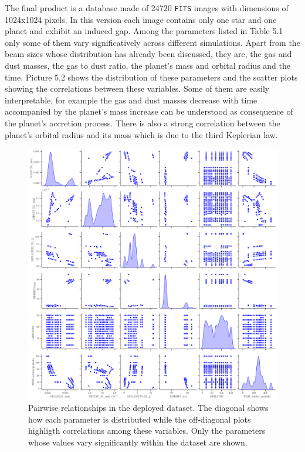 \documentclass[a4paper,10pt]{report}
\begin{document}
The final product is a database made of 24720 \lstinline{FITS} images with dimensions of 1024x1024 pixels. In this
version each image contains only one star and one planet and exhibit an induced gap.
Among the parameters listed in Table 5.1 only some of them vary significatively across different simulations.
Apart from the beam sizes whose distribution has already been discussed, they are, the gas and dust masses, the gas to dust ratio, 
the planet's mass and orbital radius and the time. Picture 5.2 shows the distribution of these parameters and the scatter
plots showing the correlations between these variables. Some of them are easily interpretable, for example the
gas and dust masses decrease with time accompanied by the planet's mass increase can be understood as consequence of the planet's accretion
process. There is also a strong correlation between the planet's orbital radius and its mass which is due to the third Keplerian law.

\begin{figure}
    \begin{center}
        \includegraphics[width=\textwidth]{images/pairplot.png}
    \end{center}
    \caption{Pairwise relationships in the deployed dataset. The diagonal shows how each parameter is distributed
    while the off-diagonal plots highligth correlations among these variables. Only the parameters whose values vary
    significantly within the dataset are shown.}
\end{figure}
\end{document}
